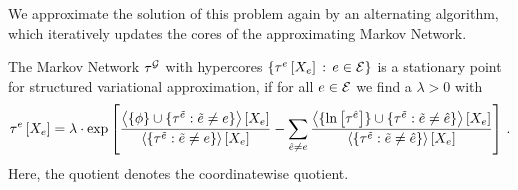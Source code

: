 We approximate the solution of this problem again by an alternating algorithm, which iteratively updates the cores of the approximating Markov Network.

\begin{theorem}
    \label{the:updateEquationStructuredVariational}
    The Markov Network $\tau^{\mathcal{G}}$ with hypercores $\left\{\tau^{e}\left[X_{e}\right]\, : \, e\in\mathcal{E}\right\}$ is a stationary point for structured variational approximation, if for all $e\in\mathcal{E}$ we find a $\lambda>0$ with
    \begin{align*}
        \tau^{e}\left[X_{e}\right]
        = \lambda\cdot \mathrm{exp}\left[
            \frac{
                \left\langle \{\phi\}\cup\{
                \tau^{\tilde{e}} : \tilde{e}\neq e
                \}\right\rangle \left[ X_{e} \right]
            }{
                \left\langle \{
                \tau^{\tilde{e}} : \tilde{e}\neq e
                \}\right\rangle \left[ X_{e} \right]
            }
            - \sum_{\hat{e}\neq e}
            \frac{
                \left\langle \{\ln \left[ \tau^{\hat{e}} \right]\}\cup\{
                \tau^{\tilde{e}} : \tilde{e}\neq\hat{e}
                \}\right\rangle \left[ X_{e} \right]
            }{
                \left\langle \{
                \tau^{\tilde{e}} : \tilde{e}\neq\hat{e}
                \}\right\rangle \left[ X_{e} \right]
            }
        \right] \, .
    \end{align*}
    Here, the quotient denotes the coordinatewise quotient.
\end{theorem}
